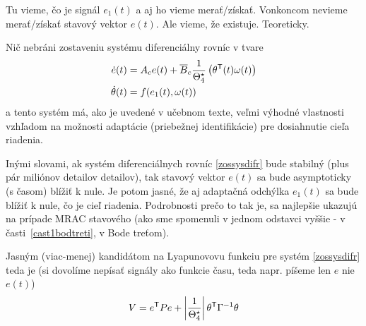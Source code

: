 \documentclass[a4paper, 10pt, ]{article}
\begin{document}
Tu vieme, čo je signál $e_1(t)$ a aj ho vieme merať/získať. Vonkoncom nevieme merať/získať stavový vektor $e(t)$. Ale vieme, že existuje. Teoreticky.

Nič nebráni zostaveniu systému diferenciálny rovníc v tvare
\begin{subequations} \label{zossysdifr}
	\begin{align}
		\dot e(t) &= A_c e(t) + \overline{B}_c \frac{1}{\Theta_4^\star} \left( \theta^{\mathsf{T}}(t) \omega(t) \right) \\
		\dot \theta(t) &= f(e_1(t), \omega(t))
	\end{align}
\end{subequations}
a tento systém má, ako je uvedené v učebnom texte, veľmi výhodné vlastnosti vzhľadom na možnosti adaptácie (priebežnej identifikácie) pre dosiahnutie cieľa riadenia.

Inými slovami, ak systém diferenciálnych rovníc \eqref{zossysdifr} bude stabilný (plus pár miliónov detailov detailov), tak stavový vektor $e(t)$ sa bude asymptoticky (s časom) blížiť k nule. Je potom jasné, že aj adaptačná odchýlka $e_1(t)$ sa bude blížiť k nule, čo je cieľ riadenia. Podrobnosti prečo to tak je, sa najlepšie ukazujú na prípade MRAC stavového (ako sme spomenuli v jednom odstavci vyššie - v časti~\ref{cast1bodtreti}, v Bode treťom).

Jasným (viac-menej) kandidátom na Lyapunovovu funkciu pre systém \eqref{zossysdifr} teda je (si dovolíme nepísať signály ako funkcie času, teda napr. píšeme len $e$ nie $e(t)$)
\begin{equation}
	V = e^{\mathsf{T}} P e + \left| \frac{1}{\Theta_4^\star} \right| \theta^{\mathsf{T}} \Gamma^{-1} \theta
\end{equation}
\end{document}
